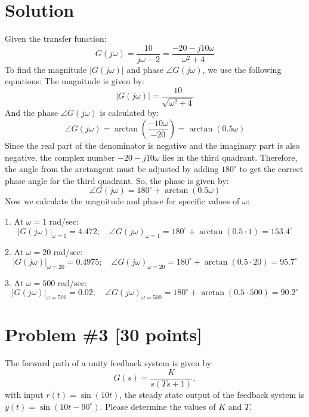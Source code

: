 \documentclass[11pt]{article}
\begin{document}
\section*{Solution}
Given the transfer function:
\[
G(j\omega) = \frac{10}{j\omega - 2} = \frac{-20 - j10\omega}{\omega^2 + 4}
\]
To find the magnitude \( |G(j\omega)| \) and phase \( \angle G(j\omega) \), we use the following equations:
\newline
\newline
The magnitude is given by:
\[
|G(j\omega)| = \frac{10}{\sqrt{\omega^2 + 4}}
\]
And the phase \( \angle G(j\omega) \) is calculated by:
\[
\angle G(j\omega) = \arctan\left(\frac{-10\omega}{-20}\right) = \arctan\left(0.5\omega\right)
\]
Since the real part of the denominator is negative and the imaginary part is also negative, the complex number \( -20 - j10\omega \) lies in the third quadrant. Therefore, the angle from the arctangent must be adjusted by adding \( 180^\circ \) to get the correct phase angle for the third quadrant.
\newline\newline
So, the phase is given by:
\[
\angle G(j\omega) = 180^\circ + \arctan\left(0.5\omega\right)
\]
Now we calculate the magnitude and phase for specific values of \( \omega \):

1. At \( \omega = 1 \) rad/sec:
\[
|G(j\omega)|_{\omega=1} = 4.472; \quad \angle G(j\omega)_{\omega=1} = 180^\circ + \arctan\left(0.5 \cdot 1\right) = 153.4^\circ
\]

2. At \( \omega = 20 \) rad/sec:
\[
|G(j\omega)|_{\omega=20} = 0.4975; \quad \angle G(j\omega)_{\omega=20} = 180^\circ + \arctan\left(0.5 \cdot 20\right) = 95.7^\circ
\]

3. At \( \omega = 500 \) rad/sec:
\[
|G(j\omega)|_{\omega=500} = 0.02; \quad \angle G(j\omega)_{\omega=500} = 180^\circ + \arctan\left(0.5 \cdot 500\right) = 90.2^\circ
\]


\newpage
\section*{Problem \#3 [30 points]}
The forward path of a unity feedback system is given by
\[
G(s) = \frac{K}{s(Ts+1)},
\]
with input \( r(t) = \sin(10t) \), the steady state output of the feedback system is \( y(t) = \sin(10t - 90^\circ) \). Please determine the values of \( K \) and \( T \).
\end{document}
